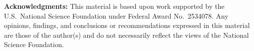 \documentclass[../main.tex]{subfiles}
\begin{document}
\begin{abstract}

Very abstract\ldots

hello
\end{abstract}

\vfill
{\footnotesize\textbf{Acknowledgments:} This material is based upon work supported by the U.S.\ 
National Science Foundation under Federal Award No.~2534078.
Any opinions, findings, and conclusions or recommendations expressed
in this material are those of the author(s) and do not necessarily
reflect the views of the National Science Foundation.
}
\end{document}
